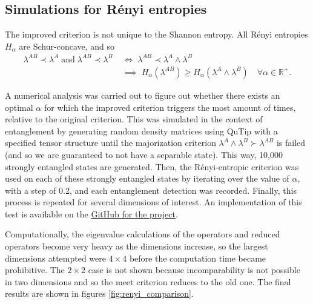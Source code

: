 \subsection{Simulations for R\'enyi entropies}

The improved criterion is not unique to the Shannon entropy. All Rényi entropies $H_\alpha$ are Schur-concave, and so
\begin{align}
    \lambda^{AB} \prec \lambda^A \; \text{and} \; \lambda^{AB} \prec \lambda^{B} \; &\iff \; \lambda^{AB} \prec \lambda^A \wedge \lambda^B \;\\ &\implies \; H_\alpha(\lambda^{AB}) \geq H_\alpha(\lambda^A \wedge \lambda^B) \quad \forall \alpha \in \mathbb{R}^+.
\end{align}

A numerical analysis was carried out to figure out whether there exists an optimal $\alpha$ for which the improved criterion triggers the most amount of times, relative to the original criterion. This was simulated in the context of entanglement by generating random density matrices using QuTip with a specified tensor structure until the majorization criterion $\lambda^A \wedge \lambda^B \succ \lambda^{AB}$ is failed (and so we are guaranteed to not have a separable state). This way, 10,000 strongly entangled states are generated. Then, the Rényi-entropic criterion was used on each of these strongly entangled states by iterating over the value of $\alpha$, with a step of 0.2, and each entanglement detection was recorded. Finally, this process is repeated for several dimensions of interest. An implementation of this test is available on the \href{https://github.com/traaldbjerg/MajoLat}{GitHub for the project}.

Computationally, the eigenvalue calculations of the operators and reduced operators become very heavy as the dimensions increase, so the largest dimensions attempted were $4 \times 4$ before the computation time became prohibitive. The $2 \times 2$ case is not shown because incomparability is not possible in two dimensions and so the meet criterion reduces to the old one. The final results are shown in figures \ref{fig:renyi_comparison}.

